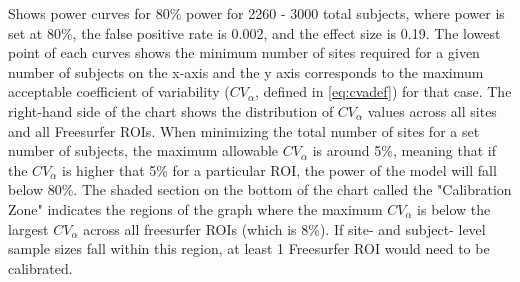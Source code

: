 \label{fig:cv_j} Shows power curves for 80\% power for 2260 - 3000 total subjects, where power is set at 80\%, the false positive rate is 0.002, and the effect size is 0.19. The lowest point of each curves shows the minimum number of sites required for a given number of subjects on the x-axis and the y axis corresponds to the maximum acceptable coefficient of variability ($CV_{\alpha}$, defined in \ref{eq:cvadef}) for that case. The right-hand side of the chart shows the distribution of $CV_{\alpha}$ values across all sites and all Freesurfer ROIs. When minimizing the total number of sites for a set number of subjects, the maximum allowable $CV_{\alpha}$ is around 5\%, meaning that if the $CV_{\alpha}$ is higher that 5\% for a particular ROI, the power of the model will fall below 80\%. The shaded section on the bottom of the chart called the "Calibration Zone" indicates the regions of the graph where the maximum $CV_{\alpha}$ is below the largest $CV_{\alpha}$ across all freesurfer ROIs (which is 8\%). If site- and subject- level sample sizes fall within this region, at least 1 Freesurfer ROI would need to be calibrated.